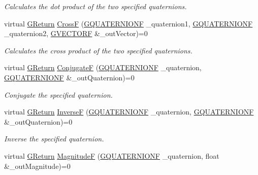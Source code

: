 \begin{DoxyCompactItemize}
\begin{DoxyCompactList}\small\item\em Calculates the dot product of the two specified quaternions. \end{DoxyCompactList}\item 
virtual \mbox{\hyperlink{namespace_g_w_a67a839e3df7ea8a5c5686613a7a3de21}{G\+Return}} \mbox{\hyperlink{class_g_w_1_1_m_a_t_h_1_1_g_quaternion_ac3ee5d4e49669083b9ea57dd408edbbe}{CrossF}} (\mbox{\hyperlink{struct_g_w_1_1_m_a_t_h_1_1_g_q_u_a_t_e_r_n_i_o_n_f}{G\+Q\+U\+A\+T\+E\+R\+N\+I\+O\+NF}} \+\_\+quaternion1, \mbox{\hyperlink{struct_g_w_1_1_m_a_t_h_1_1_g_q_u_a_t_e_r_n_i_o_n_f}{G\+Q\+U\+A\+T\+E\+R\+N\+I\+O\+NF}} \+\_\+quaternion2, \mbox{\hyperlink{struct_g_w_1_1_m_a_t_h_1_1_g_v_e_c_t_o_r_f}{G\+V\+E\+C\+T\+O\+RF}} \&\+\_\+out\+Vector)=0
\begin{DoxyCompactList}\small\item\em Calculates the cross product of the two specified quaternions. \end{DoxyCompactList}\item 
virtual \mbox{\hyperlink{namespace_g_w_a67a839e3df7ea8a5c5686613a7a3de21}{G\+Return}} \mbox{\hyperlink{class_g_w_1_1_m_a_t_h_1_1_g_quaternion_adc0da83f5c6011f45195ae98a3f1fa8d}{ConjugateF}} (\mbox{\hyperlink{struct_g_w_1_1_m_a_t_h_1_1_g_q_u_a_t_e_r_n_i_o_n_f}{G\+Q\+U\+A\+T\+E\+R\+N\+I\+O\+NF}} \+\_\+quaternion, \mbox{\hyperlink{struct_g_w_1_1_m_a_t_h_1_1_g_q_u_a_t_e_r_n_i_o_n_f}{G\+Q\+U\+A\+T\+E\+R\+N\+I\+O\+NF}} \&\+\_\+out\+Quaternion)=0
\begin{DoxyCompactList}\small\item\em Conjugate the specified quaternion. \end{DoxyCompactList}\item 
virtual \mbox{\hyperlink{namespace_g_w_a67a839e3df7ea8a5c5686613a7a3de21}{G\+Return}} \mbox{\hyperlink{class_g_w_1_1_m_a_t_h_1_1_g_quaternion_a0d8a509536ddf1a4840f48f719686b22}{InverseF}} (\mbox{\hyperlink{struct_g_w_1_1_m_a_t_h_1_1_g_q_u_a_t_e_r_n_i_o_n_f}{G\+Q\+U\+A\+T\+E\+R\+N\+I\+O\+NF}} \+\_\+quaternion, \mbox{\hyperlink{struct_g_w_1_1_m_a_t_h_1_1_g_q_u_a_t_e_r_n_i_o_n_f}{G\+Q\+U\+A\+T\+E\+R\+N\+I\+O\+NF}} \&\+\_\+out\+Quaternion)=0
\begin{DoxyCompactList}\small\item\em Inverse the specified quaternion. \end{DoxyCompactList}\item 
virtual \mbox{\hyperlink{namespace_g_w_a67a839e3df7ea8a5c5686613a7a3de21}{G\+Return}} \mbox{\hyperlink{class_g_w_1_1_m_a_t_h_1_1_g_quaternion_a47c8b900ab4ab210631f1dfb280c89fd}{MagnitudeF}} (\mbox{\hyperlink{struct_g_w_1_1_m_a_t_h_1_1_g_q_u_a_t_e_r_n_i_o_n_f}{G\+Q\+U\+A\+T\+E\+R\+N\+I\+O\+NF}} \+\_\+quaternion, float \&\+\_\+out\+Magnitude)=0

\end{DoxyCompactItemize}
